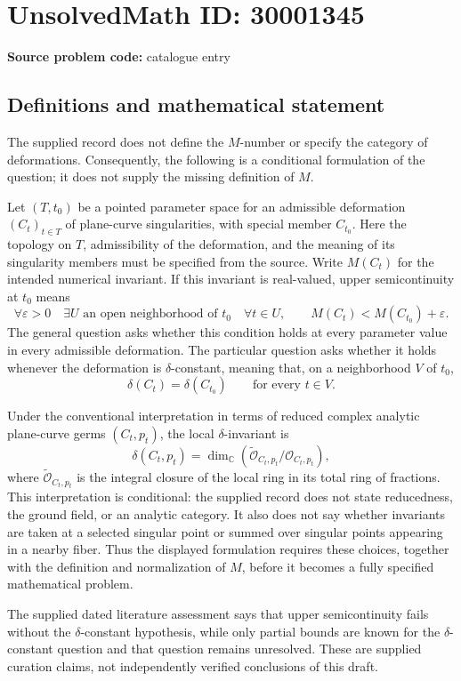 \documentclass[11pt]{article}
\newcommand{\C}{\mathbb{C}}
\begin{document}
\section*{UnsolvedMath ID: 30001345}
\textbf{Source problem code:} catalogue entry
\subsection{Definitions and mathematical statement}
The supplied record does not define the \(M\)-number or specify the category of deformations. Consequently, the following is a conditional formulation of the question; it does not supply the missing definition of \(M\).

Let \((T,t_0)\) be a pointed parameter space for an admissible deformation \((C_t)_{t\in T}\) of plane-curve singularities, with special member \(C_{t_0}\). Here the topology on \(T\), admissibility of the deformation, and the meaning of its singularity members must be specified from the source. Write \(M(C_t)\) for the intended numerical invariant. If this invariant is real-valued, upper semicontinuity at \(t_0\) means
\[
\forall\varepsilon>0\quad\exists U\text{ an open neighborhood of }t_0\quad\forall t\in U,\qquad M(C_t)<M(C_{t_0})+\varepsilon.
\]
The general question asks whether this condition holds at every parameter value in every admissible deformation. The particular question asks whether it holds whenever the deformation is \(\delta\)-constant, meaning that, on a neighborhood \(V\) of \(t_0\),
\[
\delta(C_t)=\delta(C_{t_0})\qquad\text{for every }t\in V.
\]

Under the conventional interpretation in terms of reduced complex analytic plane-curve germs \((C_t,p_t)\), the local \(\delta\)-invariant is
\[
\delta(C_t,p_t)=\dim_{\C}\!\left(\widetilde{\mathcal O}_{C_t,p_t}/\mathcal O_{C_t,p_t}\right),
\]
where \(\widetilde{\mathcal O}_{C_t,p_t}\) is the integral closure of the local ring in its total ring of fractions. This interpretation is conditional: the supplied record does not state reducedness, the ground field, or an analytic category. It also does not say whether invariants are taken at a selected singular point or summed over singular points appearing in a nearby fiber. Thus the displayed formulation requires these choices, together with the definition and normalization of \(M\), before it becomes a fully specified mathematical problem.

The supplied dated literature assessment says that upper semicontinuity fails without the \(\delta\)-constant hypothesis, while only partial bounds are known for the \(\delta\)-constant question and that question remains unresolved. These are supplied curation claims, not independently verified conclusions of this draft.
\end{document}
